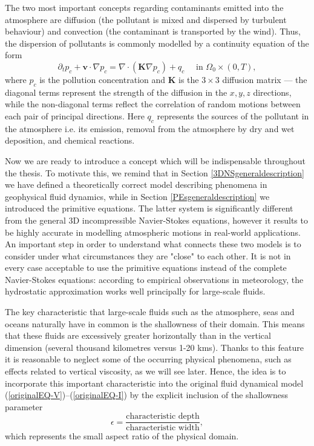\documentclass[12pt]{report}
\numberwithin{theorem}{chapter}
\numberwithin{corollary}{chapter}
\numberwithin{lemma}{chapter}
\numberwithin{remark}{chapter}
\numberwithin{definition}{chapter}
\numberwithin{prop}{chapter}
\begin{document}
The two most important concepts regarding contaminants emitted into the atmosphere are diffusion (the pollutant is mixed and dispersed by turbulent behaviour) and convection (the contaminant is transported by the wind). Thus, the dispersion of pollutants is commonly modelled by a continuity equation of the form
%
\begin{equation} \label{diffusive}
  \partial_t p_c + \mathbf{v} \cdot \nabla p_c = \nabla \cdot (\mathbf{K} \nabla p_c) + q_c \quad \text{ in } \Omega_0 \times (0,T),
\end{equation}
%
where $p_c$ is the pollution concentration and $\mathbf{K}$ is the $3 \times 3$ diffusion matrix --- the diagonal terms represent the strength of the diffusion in the $x, y, z$ directions, while the non-diagonal terms reflect the correlation of random motions between each pair of principal directions. Here $q_c$ represents the sources of the pollutant in the atmosphere i.e. its emission, removal from the atmosphere by dry and wet deposition, and chemical reactions.

Now we are ready to introduce a concept which will be indispensable throughout the thesis. To motivate this, we remind that in Section \ref{3DNSgeneraldescription} we have defined a theoretically correct model describing phenomena in geophysical fluid dynamics, while in Section \ref{PEsgeneraldescription} we introduced the primitive equations. The latter system is significantly different from the general 3D incompressible Navier-Stokes equations, however it results to be highly accurate in modelling atmospheric motions in real-world applications. An important step in order to understand what connects these two models is to consider under what circumstances they are "close" to each other. It is not in every case acceptable to use the primitive equations instead of the complete Navier-Stokes equations: according to empirical observations in meteorology, the hydrostatic approximation works well principally for large-scale fluids.

The key characteristic that large-scale fluids such as the atmosphere, seas and oceans naturally have in common is the shallowness of their domain. This means that these fluids are excessively greater horizontally than in the vertical dimension (several thousand kilometres versus 1-20 kms). Thanks to this feature it is reasonable to neglect some of the occurring physical phenomena, such as effects related to vertical viscosity, as we will see later. Hence, the idea is to incorporate this important characteristic into the original fluid dynamical model (\ref{originalEQ-V})--(\ref{originalEQ-I}) by the explicit inclusion of the shallowness parameter
%
$$\epsilon = \frac{\text{characteristic depth}}{\text{characteristic width}},$$
%
which represents the small aspect ratio of the physical domain.
\end{document}
